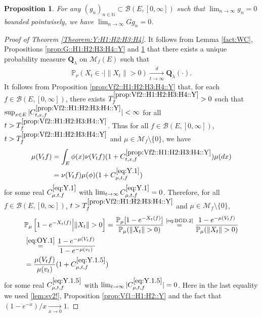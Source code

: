 \documentclass[12pt,a4paper]{amsart}
\numberwithin{equation}{section}
\theoremstyle{plain}
\newtheorem{prop}[thm]{Proposition}
\theoremstyle{definition}
\theoremstyle{remark}
\begin{document}
\begin{prop} \label{prop::GD:H1:H2:H3:H4::Y}
	For any $(g_n)_{n\in \mathbb N} \subset \mathcal B(E,[0,\infty])$ such that $\lim_{n\to \infty} g_n = 0$ bounded pointwisely, we have $\lim_{n\to \infty} G g_n = 0$.
\end{prop}

\begin{proof}[Proof of Theorem \ref{Theorem:Y:H1:H2:H3:H4}]
	It follows from Lemma \ref{fact:WC}, Propositions \ref{prop:G::H1:H2:H3:H4::Y} and \ref{prop::GD:H1:H2:H3:H4::Y} that there exists a unique probability measure $\mathbf Q_\lambda$ on $\mathcal M_f(E)$ such that
\begin{align}\label{eq:Y.0}
 	\mathbb P_{\nu}(X_t \in \cdot | \|X_t\|>0 )
 	\xrightarrow[t\to \infty]{d} \mathbf Q_\lambda(\cdot).
\end{align}
	It follows from Proposition \ref{prop:Vf2::H1:H2:H3:H4::Y} that, for each $f \in \mathcal B(E,[0,\infty])$, there exists $T^{\ref{prop:Vf2::H1:H2:H3:H4::Y}}_f>0$ such that $\sup_{x\in E} |C^{\ref{prop:Vf2::H1:H2:H3:H4::Y}}_{t,x,f}|< \infty$ for all $t>T^{\ref{prop:Vf2::H1:H2:H3:H4::Y}}_f$.
	Thus for all $f \in \mathcal B(E,[0,\infty])$, $t>T^{\ref{prop:Vf2::H1:H2:H3:H4::Y}}_f$ and $\mu \in \mathcal M_f\setminus\{0\}$, we have
\begin{align}
	\mu(V_tf) 
	&= \int_E  \phi(x) \nu (V_tf) (1+C^{\ref{prop:Vf2::H1:H2:H3:H4::Y}}_{t,x,f})\mu(dx)
	\\ \label{eq:Y.1} & = \nu(V_tf) \mu(\phi)(1+ C^{\eqref{eq:Y.1}}_{\mu,t,f})
\end{align}
	for some real $C^{\eqref{eq:Y.1}}_{\mu,t,f}$ with $\lim_{t\to \infty} C^{\eqref{eq:Y.1}}_{\mu,t,f} = 0$.
	Therefore, for all $f\in \mathcal B(E,[0,\infty])$, $t > T_f^{\ref{prop:Vf2::H1:H2:H3:H4::Y}}$ and $\mu \in \mathcal M_f \setminus\{0\}$,
\begin{align}
	&\mathbb P_\mu \left[1 - e^{-X_t(f)} \middle|\|X_t\|>0\right]
	= \frac{\mathbb P_\mu [ 1 - e^{- X_t(f)}]} {\mathbb P_\mu (\|X_t\| > 0) }
	\overset{\text{\eqref{eq:BGD.2}}}= \frac{1 - e^{- \mu(V_tf)}} { \mathbb P_\mu(\|X_t\| > 0)}
	\\&\overset{\eqref{eq:OY.1}}= \frac{1 - e^{- \mu(V_tf)}} {1 - e^{-\mu(v_t)}}
	\\\label{eq:Y.1.5}& = \frac{ \mu(V_t f) }{ \mu(v_t) } (1+C^{\eqref{eq:Y.1.5}}_{\mu,t,f})
	\end{align}
	for some real $C^{\eqref{eq:Y.1.5}}_{\mu,t,f}$ with $\lim_{t\to \infty} |C^{\eqref{eq:Y.1.5}}_{\mu,t,f}| = 0$. 
	Here in the last equality we used \eqref{lem:sv2!}, Proposition \ref{prop:Vf1::H1:H2::Y} and the fact that $(1-e^{-x})/x \xrightarrow[x\to 0]{}1$. 

\end{proof}
\end{document}

